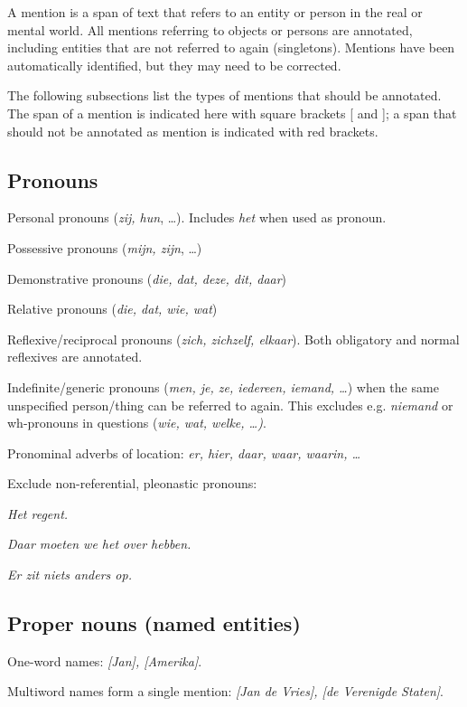 A mention is a span of text that refers to an entity or person in the
real or mental world. All mentions referring to objects or persons are
annotated, including entities that are not referred to again
(singletons). Mentions have been automatically identified, but they may
need to be corrected.

The following subsections list the types of mentions that should be annotated.
The span of a mention is indicated here with square brackets {[} and {]};
a span that should not be annotated as mention is indicated with \n{[} red brackets\n{]}.

\subsection{Pronouns}
\begin{itemize*}
    \item Personal pronouns (\emph{zij, hun}, \dots).
        Includes \emph{het} when used as pronoun.
    \item Possessive pronouns (\emph{mijn, zijn}, \dots)
    \item Demonstrative pronouns (\emph{die, dat, deze, dit, daar})
    \item Relative pronouns (\emph{die, dat, wie, wat})
    \item Reflexive/reciprocal pronouns (\emph{zich, zichzelf, elkaar}).
        Both obligatory and normal reflexives are annotated.
    \item Indefinite/generic pronouns (\emph{men, je, ze, iedereen, iemand, \dots})
      when the same unspecified person/thing can be referred to again. This
      excludes e.g. \emph{niemand} or wh-pronouns in questions
      (\emph{wie, wat, welke, \dots)}.
    \item Pronominal adverbs of location: \emph{er, hier, daar, waar, waarin, \dots}
\end{itemize*}

Exclude non-referential, pleonastic pronouns:
\begin{itemize*}
   \item \emph{\n{[}Het\n{]} regent.}
   \item \emph{Daar moeten we \n{[}het\n{]} over hebben.}
   \item \emph{\n{[}Er\n{]} zit niets anders op.}
\end{itemize*}


\subsection{Proper nouns (named entities)}
\begin{itemize*}
    \item One-word names: \emph{[Jan], [Amerika]}.
    \item Multiword names form a single mention: \emph{[Jan de Vries], [de Verenigde Staten]}.
\end{itemize*}


